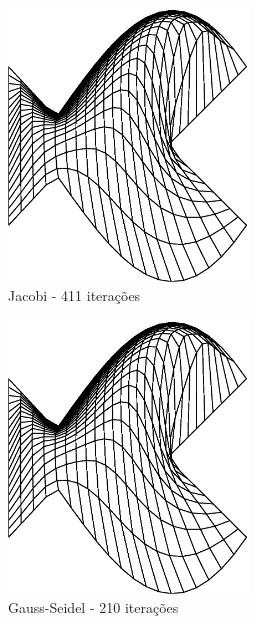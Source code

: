 \documentclass{article}
\begin{document}
		\begin{figure}
		\centering
			\begin{subfigure}[b]{0.45\textwidth}
				\centering
				\includegraphics[width=0.7\textwidth]{figures/fish-ttm-jacobi.eps}
				\caption{Jacobi - 411 iterações}
			\end{subfigure}
			\begin{subfigure}[b]{0.45\textwidth}
				\centering
				\includegraphics[width=0.7\textwidth]{figures/fish-ttm-gauss.eps}
				\caption{Gauss-Seidel - 210 iterações}
			\end{subfigure}
			\begin{subfigure}[b]{0.45\textwidth}

\end{subfigure}
\end{figure}
\end{document}
